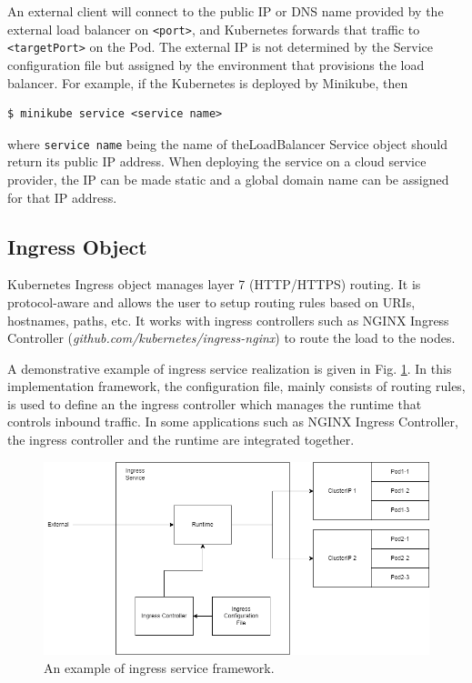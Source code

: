 An external client will connect to the public IP or DNS name provided by the external load balancer on \verb|<port>|, and Kubernetes forwards that traffic to \verb|<targetPort>| on the Pod. The external IP is not determined by the Service configuration file but assigned by the environment that provisions the load balancer. For example, if the Kubernetes is deployed by Minikube, then
\begin{lstlisting}
$ minikube service <service name>
\end{lstlisting}
where \texttt{service name} being the name of theLoadBalancer Service object should return its public IP address. When deploying the service on a cloud service provider, the IP can be made static and a global domain name can be assigned for that IP address.

\subsection{Ingress Object}

Kubernetes Ingress object manages layer 7 (HTTP/HTTPS) routing. It is protocol-aware and allows the user to setup routing rules based on URIs, hostnames, paths, etc. It works with ingress controllers such as NGINX Ingress Controller (\textit{github.com/kubernetes/ingress-nginx}) to route the load to the nodes.

A demonstrative example of ingress service realization is given in Fig. \ref{ch:vac:fig:ingress_service}. In this implementation framework, the configuration file, mainly consists of routing rules, is used to define an the ingress controller which manages the runtime that controls inbound traffic. In some applications such as NGINX Ingress Controller, the ingress controller and the runtime are integrated together.

\begin{figure}[!htb]
	\centering
	\includegraphics[width=350pt]{chapters/part-3/figures/ingress_service.png}
	\caption{An example of ingress service framework.} \label{ch:vac:fig:ingress_service}
\end{figure}

